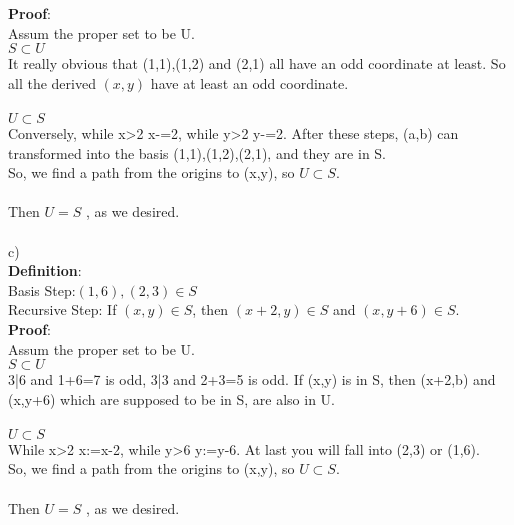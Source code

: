 \documentclass[UTF8]{article}
\begin{document}
\begin{description}
        \textbf{Proof}: \\ 
        Assum the proper set to be U.\\
        $S \subset U$ \\
         It really obvious that (1,1),(1,2) and (2,1) all have an odd coordinate at least. So all the derived $(x,y)$ have at least an odd coordinate. \\\\
        $U \subset S$ \\
         Conversely, while x>2 x-=2, while y>2 y-=2. After these steps, (a,b) can transformed into the basis (1,1),(1,2),(2,1), and they are in S.\\
        So, we find a path from the origins to (x,y), so $U \subset S$. \\\\
        Then  $U=S$ , as we desired. \\\\

        c)\\
        \textbf{Definition}:\\
        Basis Step:$(1,6),(2,3) \in S$  \\
        Recursive Step: If $(x,y)\in S$, then $(x+2,y)\in S$ and $(x,y+6)\in S$.\\

        \textbf{Proof}: \\ 
        Assum the proper set to be U.\\
        $S \subset U$ \\
        3|6 and 1+6=7 is odd, 3|3 and 2+3=5 is odd. If (x,y) is in S, then (x+2,b) and (x,y+6) which are supposed to be in S, are also in U.\\\\
        $U \subset S$ \\
        While x>2 x:=x-2, while y>6 y:=y-6. At last you will fall into (2,3) or (1,6).\\

        So, we find a path from the origins to (x,y), so $U \subset S$. \\\\
        Then  $U=S$ , as we desired. \\\\

\end{description}
\end{document}
